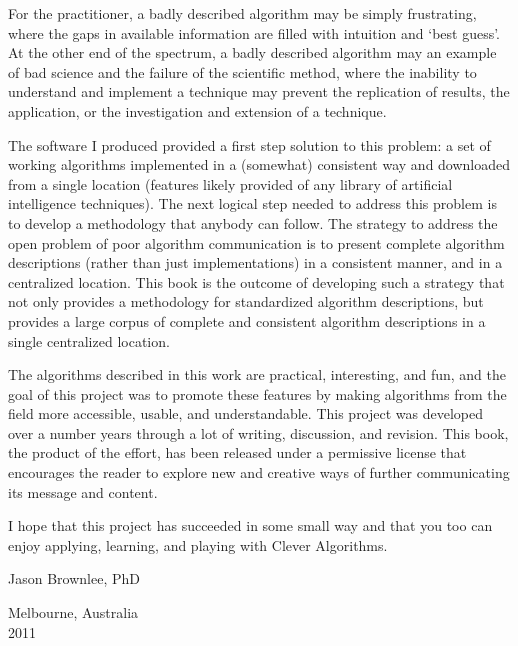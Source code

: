 For the practitioner, a badly described algorithm may be simply frustrating, where the gaps in available information are filled with intuition and `best guess'. At the other end of the spectrum, a badly described algorithm may an example of bad science and the failure of the scientific method, where the inability to understand and implement a technique may prevent the replication of results, the application, or the investigation and extension of a technique. 

The software I produced provided a first step solution to this problem: a set of working algorithms implemented in a (somewhat) consistent way and downloaded from a single location (features likely provided of any library of artificial intelligence techniques). The next logical step needed to address this problem is to develop a methodology that anybody can follow. The strategy to address the open problem of poor algorithm communication is to present complete algorithm descriptions (rather than just implementations) in a consistent manner, and in a centralized location.
This book is the outcome of developing such a strategy that not only provides a methodology for standardized algorithm descriptions, but provides a large corpus of complete and consistent algorithm descriptions in a single centralized location. 

The algorithms described in this work are practical, interesting, and fun, and the goal of this project was to promote these features by making algorithms from the field more accessible, usable, and understandable.
This project was developed over a number years through a lot of writing, discussion, and revision. This book, the product of the effort, has been released under a permissive license that encourages the reader to explore new and creative ways of further communicating its message and content.

I hope that this project has succeeded in some small way and that you too can enjoy applying, learning, and playing with Clever Algorithms.

\begin{flushright}
\vspace{1in}
Jason Brownlee, PhD
\end{flushright}

\begin{flushleft}
\vspace{0.2in}
Melbourne, Australia \\
2011
\end{flushleft}
